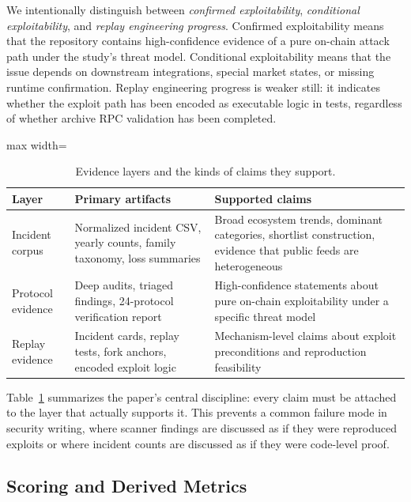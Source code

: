 We intentionally distinguish between \emph{confirmed exploitability}, \emph{conditional exploitability}, and \emph{replay engineering progress}. Confirmed exploitability means that the repository contains high-confidence evidence of a pure on-chain attack path under the study's threat model. Conditional exploitability means that the issue depends on downstream integrations, special market states, or missing runtime confirmation. Replay engineering progress is weaker still: it indicates whether the exploit path has been encoded as executable logic in tests, regardless of whether archive RPC validation has been completed.

\begin{table}[t]
\centering
\caption{Evidence layers and the kinds of claims they support.}
\label{tab:evidence-layers}
\begin{adjustbox}{max width=\textwidth}
\begin{tabular}{p{2.0cm}p{3.8cm}p{6.0cm}}
\toprule
\textbf{Layer} & \textbf{Primary artifacts} & \textbf{Supported claims} \\
\midrule
Incident corpus & Normalized incident CSV, yearly counts, family taxonomy, loss summaries & Broad ecosystem trends, dominant categories, shortlist construction, evidence that public feeds are heterogeneous \\
Protocol evidence & Deep audits, triaged findings, 24-protocol verification report & High-confidence statements about pure on-chain exploitability under a specific threat model \\
Replay evidence & Incident cards, replay tests, fork anchors, encoded exploit logic & Mechanism-level claims about exploit preconditions and reproduction feasibility \\
\bottomrule
\end{tabular}
\end{adjustbox}
\end{table}

Table~\ref{tab:evidence-layers} summarizes the paper's central discipline: every claim must be attached to the layer that actually supports it. This prevents a common failure mode in security writing, where scanner findings are discussed as if they were reproduced exploits or where incident counts are discussed as if they were code-level proof.

\subsection{Scoring and Derived Metrics}

